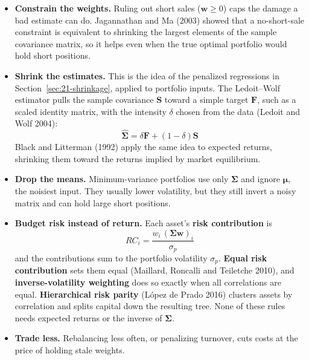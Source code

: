 \begin{itemize}
  \item \textbf{Constrain the weights.} Ruling out short sales ($\mathbf{w} \geq 0$) caps the damage a bad estimate can do. Jagannathan and Ma (2003) showed that a no-short-sale constraint is equivalent to shrinking the largest elements of the sample covariance matrix, so it helps even when the true optimal portfolio would hold short positions.
  \item \textbf{Shrink the estimates.} This is the idea of the penalized regressions in Section~\ref{sec:21-shrinkage}, applied to portfolio inputs. The Ledoit--Wolf estimator pulls the sample covariance $\mathbf{S}$ toward a simple target $\mathbf{F}$, such as a scaled identity matrix, with the intensity $\delta$ chosen from the data (Ledoit and Wolf 2004):
  \begin{equation}
    \hat{\boldsymbol{\Sigma}} = \delta\mathbf{F} + (1 - \delta)\mathbf{S}
    \label{eq:19-shrink}
  \end{equation}
  Black and Litterman (1992) apply the same idea to expected returns, shrinking them toward the returns implied by market equilibrium.
  \item \textbf{Drop the means.} Minimum-variance portfolios use only $\boldsymbol{\Sigma}$ and ignore $\boldsymbol{\mu}$, the noisiest input. They usually lower volatility, but they still invert a noisy matrix and can hold large short positions.
  \item \textbf{Budget risk instead of return.} Each asset's \textbf{risk contribution} is
  \begin{equation}
    RC_i = \frac{w_i\,(\boldsymbol{\Sigma}\mathbf{w})_i}{\sigma_p}
    \label{eq:19-rc}
  \end{equation}
  and the contributions sum to the portfolio volatility $\sigma_p$. \textbf{Equal risk contribution} sets them equal (Maillard, Roncalli and Teiletche 2010), and \textbf{inverse-volatility weighting} does so exactly when all correlations are equal. \textbf{Hierarchical risk parity} (L\'opez de Prado 2016) clusters assets by correlation and splits capital down the resulting tree. None of these rules needs expected returns or the inverse of $\boldsymbol{\Sigma}$.
  \item \textbf{Trade less.} Rebalancing less often, or penalizing turnover, cuts costs at the price of holding stale weights.
\end{itemize}

